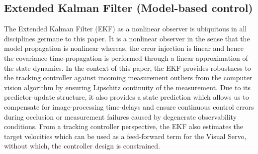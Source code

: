 %	
%
%
\subsection{Extended Kalman Filter (Model-based control)}
The Extended Kalman Filter (EKF) as a nonlinear observer is ubiquitous in all disciplines germane to this paper. It is a nonlinear observer in the sense that the model propagation is nonlinear whereas, the error injection is linear and hence the covariance time-propagation is performed through a linear approximation of the state dynamics. In the context of this paper, the EKF provides robustness to the tracking controller against incoming measurement outliers from the computer vision algorithm by ensuring Lipschitz continuity of the measurement. Due to its predictor-update structure, it also provides a state prediction which allows us to compensate for image-processing time-delays and ensure continuous control errors during occlusion or measurement failures caused by degenerate observability conditions. From a tracking controller perspective, the EKF also estimates the target velocities which can be used as a feed-forward term for the Visual Servo, without which, the controller design is constrained. 

